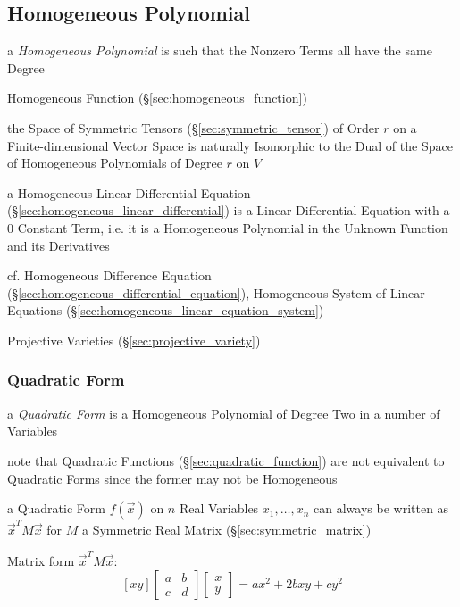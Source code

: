 \subsection{Homogeneous Polynomial}\label{sec:homogeneous_polynomial}

a \emph{Homogeneous Polynomial} is such that the Nonzero Terms all have the same
Degree

Homogeneous Function (\S\ref{sec:homogeneous_function})

the Space of Symmetric Tensors (\S\ref{sec:symmetric_tensor}) of Order $r$ on a
Finite-dimensional Vector Space is naturally Isomorphic to the Dual of the
Space of Homogeneous Polynomials of Degree $r$ on $V$

a Homogeneous Linear Differential Equation
(\S\ref{sec:homogeneous_linear_differential}) is a Linear Differential
Equation with a $0$ Constant Term, i.e. it is a Homogeneous Polynomial in the
Unknown Function and its Derivatives

cf. Homogeneous Difference Equation
(\S\ref{sec:homogeneous_differential_equation}),
Homogeneous System of Linear Equations
(\S\ref{sec:homogeneous_linear_equation_system})

Projective Varieties (\S\ref{sec:projective_variety})



\subsubsection{Quadratic Form}\label{sec:quadratic_form}

a \emph{Quadratic Form} is a Homogeneous Polynomial of Degree Two in a number of
Variables

note that Quadratic Functions (\S\ref{sec:quadratic_function}) are not
equivalent to Quadratic Forms since the former may not be Homogeneous

a Quadratic Form $f(\vec{x})$ on $n$ Real Variables $x_1,\ldots,x_n$ can always
be written as $\vec{x}^T M \vec{x}$ for $M$ a Symmetric Real Matrix
(\S\ref{sec:symmetric_matrix})

Matrix form $\vec{x}^T M \vec{x}$:
\[
  [x y]
  \begin{bmatrix}
    a & b \\
    c & d
  \end{bmatrix}
  \begin{bmatrix}
    x \\
    y
  \end{bmatrix}
  = ax^2 + 2bxy + cy^2
\]

